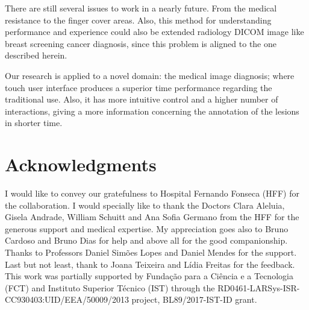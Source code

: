 \documentclass{sigchi}
\begin{document}
There are still several issues to work in a nearly future. From the medical resistance to the finger cover areas. Also, this method for understanding performance and experience could also be extended radiology DICOM image like breast screening cancer diagnosis, since this problem is aligned to the one described herein.

Our research is applied to a novel domain: the medical image diagnosis; where touch user interface produces a superior time performance regarding  the traditional use. Also, it has more intuitive control and a higher number of interactions, giving a more information concerning the annotation of the lesions in shorter time.

\section{Acknowledgments}

I would like to convey our gratefulness to Hospital Fernando Fonseca (HFF) for the collaboration. I would specially like to thank the Doctors Clara Aleluia, Gisela Andrade, William Schuitt and Ana Sofia Germano from the HFF for the generous support and medical expertise. My appreciation goes also to Bruno Cardoso and Bruno Dias for help and above all for the good companionship. Thanks to Professors Daniel Sim\~{o}es Lopes and Daniel Mendes for the support. Last but not least, thank to Joana Teixeira and L\'{i}dia Freitas for the feedback. This work was partially supported by Funda\c{c}\~{a}o para a Ci\^{e}ncia e a Tecnologia (FCT) and Instituto Superior T\'{e}cnico (IST) through the RD0461-LARSys-ISR-CC930403:UID/EEA/50009/2013 project, BL89/2017-IST-ID grant.

%
%
%
%
%
\balance



\end{document}
